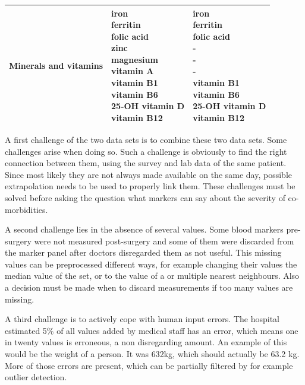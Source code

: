 \documentclass[10pt,a4paper]{article}
\begin{document}
\begin{table}
\begin{tabular}{lll}
		Minerals and vitamins & \makecell{iron\\ferritin\\folic acid\\zinc\\magnesium\\vitamin A\\vitamin B1\\vitamin B6\\25-OH vitamin D\\vitamin B12}                                        & \makecell{iron\\ferritin\\folic acid\\-\\-\\-\\vitamin B1\\vitamin B6\\25-OH vitamin D\\vitamin B12}                                                           \\ \hline
	\end{tabular}
	\end{table}

	A first challenge of the two data sets is to combine these two data sets. Some challenges arise when doing so. Such a challenge is obviously to find the right connection between them, using the survey and lab data of the same patient. Since most likely they are not always made available on the same day, possible extrapolation needs to be used to properly link them. These challenges must be solved before asking the question what markers can say about the severity of co-morbidities.

	A second challenge lies in the absence of several values. Some blood markers pre-surgery were not measured post-surgery and some of them were discarded from the marker panel after doctors disregarded them as not useful. This missing values can be preprocessed different ways, for example changing their values the median value of the set, or to the value of a or multiple nearest neighbours. Also a decision must be made when to discard measurements if too many values are missing.
	
	A third challenge is to actively cope with human input errors. The hospital estimated 5\% of all values added by medical staff has an error, which means one in twenty values is erroneous, a non disregarding amount. An example of this would be the weight of a person. It was 632kg, which should actually be 63.2 kg. More of those errors are present, which can be partially filtered by for example outlier detection.\cite{Deneer2017Thesis}
	
\end{document}
